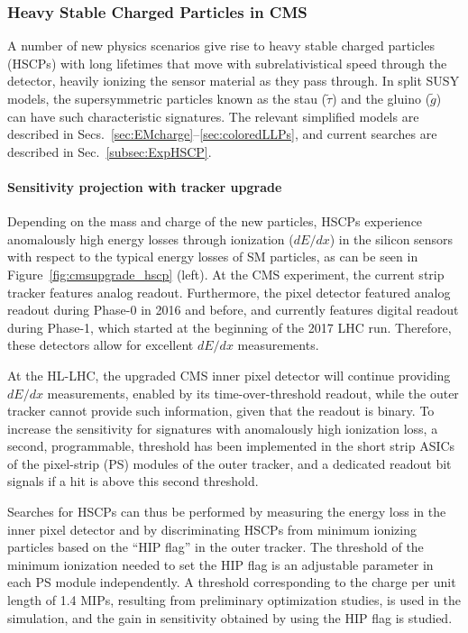 \subsubsection{Heavy Stable Charged Particles in CMS}

A number of new physics scenarios give rise to heavy stable charged particles (HSCPs) with long lifetimes that move with subrelativistical speed through the detector, heavily ionizing the sensor material as they pass through. In split SUSY models, the supersymmetric particles known as the stau ($\tilde{\tau}$) and the gluino ($\tilde{g}$) can have such characteristic signatures. The relevant simplified models are described in Secs.~\ref{sec:EMcharge}--\ref{sec:coloredLLPs}, and current searches are described in Sec.~\ref{subsec:ExpHSCP}.

\paragraph{Sensitivity projection with tracker upgrade}

Depending on the mass and charge of the new particles, HSCPs experience anomalously high energy losses through ionization ($dE/dx$) in the silicon sensors with respect to the typical energy losses of SM particles, as can be seen in Figure~\ref{fig:cmsupgrade_hscp} (left). At the CMS experiment, the current strip tracker features analog readout. Furthermore, the pixel detector featured analog readout during Phase-0 in 2016 and before, and currently features digital readout during Phase-1, which started at the beginning of the 2017 LHC run. Therefore, these detectors allow for excellent $dE/dx$ measurements.

At the HL-LHC, the upgraded CMS inner pixel detector will continue providing $dE/dx$ measurements, enabled by its time-over-threshold readout, while the outer tracker cannot provide such information, given that the readout is binary. To increase the sensitivity for signatures with anomalously high ionization loss, a second, programmable, threshold has been implemented in the short strip ASICs of the pixel-strip (PS) modules of the outer tracker, and a dedicated readout bit signals if a hit is above this second threshold.

Searches for HSCPs can thus be performed by measuring the energy loss in the inner pixel detector and by discriminating HSCPs from minimum ionizing particles based on the ``HIP flag'' in the outer tracker. The threshold of the minimum ionization needed to set the HIP flag is an adjustable parameter in each PS module independently. A threshold corresponding to the charge per unit length of 1.4 MIPs, resulting from preliminary optimization studies, is used in the simulation, and the gain in sensitivity obtained by using the HIP flag is studied.

